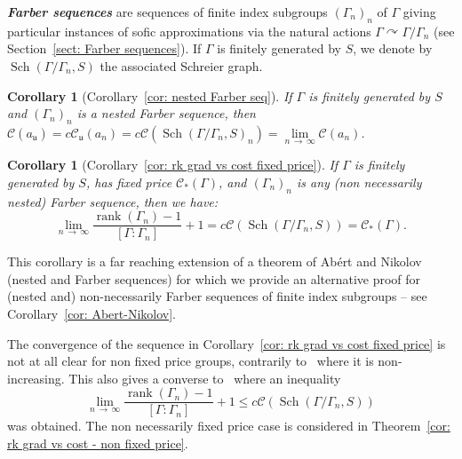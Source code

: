 \documentclass[10pt]{amsart}
\newtheorem{coro}[cdrthm]{Corollary}
\theoremstyle{definition}
\newcommand{\defin}[1]{\textbf{\emph{#1}}}
\newcommand{\acting}{\curvearrowright}
\newcommand{\cost}{\mathcal{C}}
\newcommand{\ccost}{c\mathcal{C}}
\newcommand{\vraicost}{\mathscr{C}}
\DeclareMathOperator{\rank}{rank}
\DeclareMathOperator{\Sch}{Sch}
\newcommand{\ul}{\mathfrak{u}}
\begin{document}
\defin{Farber sequences} are sequences of finite index subgroups $(\Gamma_n)_n$ of $\Gamma$ giving particular instances of sofic approximations via the natural actions $\Gamma\acting \Gamma/\Gamma_n$ (see Section~\ref{sect: Farber sequences}). If $\Gamma$ is finitely generated by $S$, we denote by $\Sch(\Gamma/\Gamma_n, S)$ the associated Schreier graph.


\begin{coro}[Corollary~\ref{cor: nested Farber seq}]\label{cor-intro nested Farber sequences}
If $\Gamma$ is finitely generated by $S$ and $(\Gamma_n)_n$ is a nested Farber sequence, then $\cost(a_{\ul})=\ccost_{\ul}(a_n)=\ccost(\Sch(\Gamma/\Gamma_n, S)_n)=\lim\limits_{n\,\to\,\infty} \cost(a_n)$.
\end{coro}


\begin{coro}[Corollary~\ref{cor: rk grad vs cost fixed price}]\label{cor-intro:cor: rk grad vs cost fixed price}
If $\Gamma$ is finitely generated by $S$, has fixed price $\vraicost_*(\Gamma)$, and $(\Gamma_n)_n$ is any (non necessarily nested) Farber sequence, then we have:
\[
\lim\limits_{n\,\to\,\infty} \frac{\rank(\Gamma_n)-1}{\left[\Gamma:\Gamma_n\right]}+1=\ccost\left(\Sch\left(\Gamma/\Gamma_n, S\right)\right)=\vraicost_*(\Gamma).
\]
\end{coro}


This corollary is a far reaching extension of a theorem of Abért and Nikolov~\cite[Theorem~1]{Abert-Nikolov-12} (nested and Farber sequences) for which we provide an alternative proof for (nested and) non-necessarily Farber sequences of finite index subgroups -- see Corollary~\ref{cor: Abert-Nikolov}.


The convergence of the sequence in Corollary~\ref{cor: rk grad vs cost fixed price} is not at all clear for non fixed price groups, contrarily to~\cite[Theorem~1]{Abert-Nikolov-12} where it is non-increasing. This also gives a converse to~\cite[Theorem~8]{Abert-Nikolov-Gelander} where an inequality
\[
\lim\limits_{n\,\to\,\infty} \frac{\rank(\Gamma_n)-1}{\left[\Gamma:\Gamma_n\right]}+1\leq \ccost\left(\Sch\left(\Gamma/\Gamma_n, S\right)\right)
\]
was obtained. The non necessarily fixed price case is considered in Theorem~\ref{cor: rk grad vs cost - non fixed price}.
\end{document}
